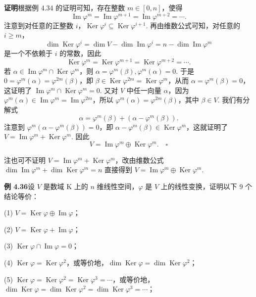 \documentclass[UTF8,12pt,a4paper,fontset=fandol]{ctexart}
\begin{document}
\noindent\textbf{证明}\quad 根据例 4.34 的证明可知，存在整数 $m\in[0,n]$，使得
\[
\operatorname{Im}\varphi^m=\operatorname{Im}\varphi^{m+1}=\operatorname{Im}\varphi^{m+2}=\cdots.
\]
注意到对任意的正整数 $i$，$\operatorname{Ker}\varphi^i\subseteq\operatorname{Ker}\varphi^{i+1}$. 再由维数公式可知，对任意的 $i\ge m$，
\[
\dim\operatorname{Ker}\varphi^i=\dim V-\dim\operatorname{Im}\varphi^i=n-\dim\operatorname{Im}\varphi^m
\]
是一个不依赖于 $i$ 的常数，因此
\[
\operatorname{Ker}\varphi^m=\operatorname{Ker}\varphi^{m+1}=\operatorname{Ker}\varphi^{m+2}=\cdots.
\]
若 $\alpha\in\operatorname{Im}\varphi^m\cap\operatorname{Ker}\varphi^m$，则 $\alpha=\varphi^m(\beta),\varphi^m(\alpha)=0$. 于是 $0=\varphi^m(\alpha)=\varphi^{2m}(\beta)$，即 $\beta\in\operatorname{Ker}\varphi^{2m}=\operatorname{Ker}\varphi^m$，从而 $\alpha=\varphi^m(\beta)=0$，这证明了 $\operatorname{Im}\varphi^m\cap\operatorname{Ker}\varphi^m=0$. 又对 $V$ 中任一向量 $\alpha$，因为 $\varphi^m(\alpha)\in\operatorname{Im}\varphi^m=\operatorname{Im}\varphi^{2m}$，所以 $\varphi^m(\alpha)=\varphi^{2m}(\beta)$，其中 $\beta\in V$. 我们有分解式
\[
\alpha=\varphi^m(\beta)+(\alpha-\varphi^m(\beta)).
\]
注意到 $\varphi^m(\alpha-\varphi^m(\beta))=0$，即 $\alpha-\varphi^m(\beta)\in\operatorname{Ker}\varphi^m$，这就证明了 $V=\operatorname{Im}\varphi^m+\operatorname{Ker}\varphi^m$. 因此
\[
V=\operatorname{Im}\varphi^m\oplus\operatorname{Ker}\varphi^m. \quad \square
\]

注\quad 也可不证明 $V=\operatorname{Im}\varphi^m+\operatorname{Ker}\varphi^m$，改由维数公式 $\dim\operatorname{Im}\varphi^m+\dim\operatorname{Ker}\varphi^m=n$ 直接得到 $V=\operatorname{Im}\varphi^m\oplus\operatorname{Ker}\varphi^m$.

\noindent\textbf{例 4.36}\quad 设 $V$ 是数域 $\mathrm{K}$ 上的 $n$ 维线性空间，$\varphi$ 是 $V$ 上的线性变换，证明以下 9 个结论等价：

(1) $V=\operatorname{Ker}\varphi\oplus\operatorname{Im}\varphi$；

(2) $V=\operatorname{Ker}\varphi+\operatorname{Im}\varphi$；

(3) $\operatorname{Ker}\varphi\cap\operatorname{Im}\varphi=0$；

(4) $\operatorname{Ker}\varphi=\operatorname{Ker}\varphi^2$，或等价地，$\dim\operatorname{Ker}\varphi=\dim\operatorname{Ker}\varphi^2$；

(5) $\operatorname{Ker}\varphi=\operatorname{Ker}\varphi^2=\operatorname{Ker}\varphi^3=\cdots$，或等价地，$\dim\operatorname{Ker}\varphi=\dim\operatorname{Ker}\varphi^2=\dim\operatorname{Ker}\varphi^3=\cdots$；
\end{document}
